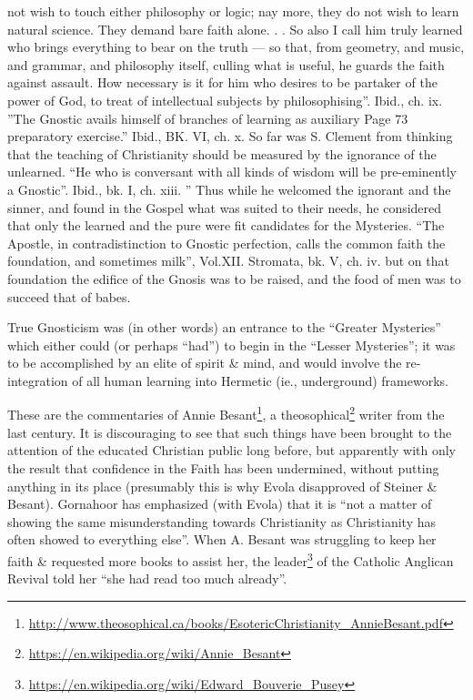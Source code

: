 \begin{quotationx}
not wish to touch either philosophy or logic; nay more, they do not wish to learn natural science. They demand bare faith alone. . . So also I call him truly learned who brings everything to bear on the truth --- so that, from geometry, and music, and grammar, and philosophy itself, culling what is useful, he guards the faith against assault. How necessary is it for him who desires to be partaker of the power of God, to treat of intellectual subjects by philosophising''. Ibid., ch. ix. ''The Gnostic avails himself of branches of learning as auxiliary Page 73 preparatory exercise.'' Ibid., BK. VI, ch. x. So far was S. Clement from thinking that the teaching of Christianity should be measured by the ignorance of the unlearned. ``He who is conversant with all kinds of wisdom will be pre-eminently a Gnostic''. Ibid., bk. I, ch. xiii. '' Thus while he welcomed the ignorant and the sinner, and found in the Gospel what was suited to their needs, he considered that only the learned and the pure were fit candidates for the Mysteries. ``The Apostle, in contradistinction to Gnostic perfection, calls the common faith the foundation, and sometimes milk'', Vol.XII. Stromata, bk. V, ch. iv. but on that foundation the edifice of the Gnosis was to be raised, and the food of men was to succeed that of babes.
\end{quotationx}

True Gnosticism was (in other words) an entrance to the ``Greater Mysteries'' which either could (or perhaps ``had'') to begin in the ``Lesser Mysteries''; it was to be accomplished by an elite of spirit \& mind, and would involve the re-integration of all human learning into Hermetic (ie., underground) frameworks.

These are the commentaries of Annie Besant\footnote{\url{http://www.theosophical.ca/books/EsotericChristianity\_AnnieBesant.pdf}}, a theosophical\footnote{\url{https://en.wikipedia.org/wiki/Annie\_Besant}} writer from the last century. It is discouraging to see that such things have been brought to the attention of the educated Christian public long before, but apparently with only the result that confidence in the Faith has been undermined, without putting anything in its place (presumably this is why Evola disapproved of Steiner \& Besant). Gornahoor has emphasized (with Evola) that it is ``not a matter of showing the same misunderstanding towards Christianity as Christianity has often showed to everything else''. When A. Besant was struggling to keep her faith \& requested more books to assist her, the leader\footnote{\url{https://en.wikipedia.org/wiki/Edward\_Bouverie\_Pusey}} of the Catholic Anglican Revival told her ``she had read too much already''.

